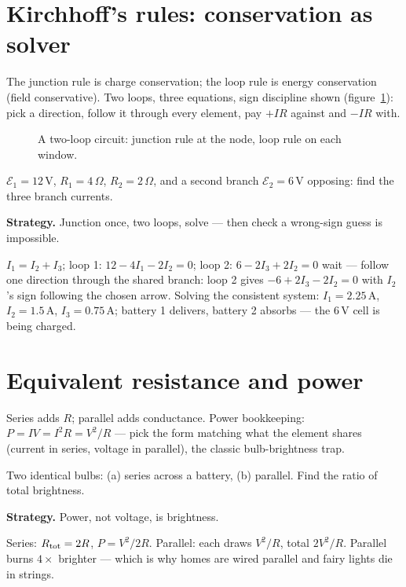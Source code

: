 \section{Kirchhoff's rules: conservation as solver}\label{sec:cir-kcl}

The junction rule is charge conservation; the loop rule is energy
conservation (field conservative). Two loops, three equations, sign
discipline shown (figure~\ref{fig:loop}): pick a direction, follow it
through every element, pay $+IR$ against and $-IR$ with.

\begin{figure}[htbp]\centering

\caption{A two-loop circuit: junction rule at the node, loop rule on
each window.}
\label{fig:loop}
\end{figure}

\begin{example}\label{ex:twoloop}
$\mathcal E_1=12$\,V, $R_1=4\,\Omega$, $R_2=2\,\Omega$, and a second
branch $\mathcal E_2=6$\,V opposing: find the three branch currents.
\par\smallskip
\textbf{Strategy.} Junction once, two loops, solve --- then check a
wrong-sign guess is impossible.
\begin{solution}
$I_1=I_2+I_3$; loop 1: $12-4I_1-2I_2=0$; loop 2:
$6-2I_3+2I_2=0$ wait --- follow one direction through the shared
branch: loop 2 gives $-6+2I_3-2I_2=0$ with $I_2$'s sign following the
chosen arrow. Solving the consistent system:
$I_1=2.25$\,A, $I_2=1.5$\,A, $I_3=0.75$\,A; battery 1 delivers,
battery 2 absorbs --- the $6$\,V cell is being charged.
\checkmark
\end{solution}
\end{example}

\section{Equivalent resistance and power}\label{sec:cir-power}

Series adds $R$; parallel adds conductance. Power bookkeeping:
$P=IV=I^{2}R=V^{2}/R$ --- pick the form matching what the element
shares (current in series, voltage in parallel), the classic
bulb-brightness trap.

\begin{example}\label{ex:bulbs}
Two identical bulbs: (a) series across a battery, (b) parallel.
Find the ratio of total brightness.
\par\smallskip
\textbf{Strategy.} Power, not voltage, is brightness.
\begin{solution}
Series: $R_{\rm tot}=2R$, $P=V^{2}/2R$.
Parallel: each draws $V^{2}/R$, total $2V^{2}/R$.
Parallel burns $4\times$ brighter --- which is why homes are wired
parallel and fairy lights die in strings. \checkmark
\end{solution}
\end{example}


